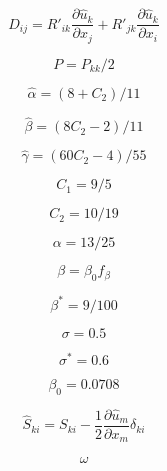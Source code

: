 \begin{equation}
D_{ij} = R'_{ik}
\frac{\partial \hat u_k}{\partial x_j}
+ R'_{jk} \frac{\partial \hat u_k}{\partial x_i}
\end{equation}

\begin{equation}
P = P_{kk}/2
\end{equation}

\begin{equation}
\hat \alpha = (8+C_2)/11
\end{equation}

\begin{equation}
\hat \beta = (8 C_2-2)/11
\end{equation}

\begin{equation}
\hat \gamma = (60 C_2 - 4)/55
\end{equation}

\begin{equation}
C_1 = 9/5
\end{equation}

\begin{equation}
C_2 = 10/19
\end{equation}

\begin{equation}
\alpha = 13/25
\end{equation}

\begin{equation}
\beta = \beta_0 f_{\beta}
\end{equation}

\begin{equation}
\beta^* = 9/100
\end{equation}

\begin{equation}
\sigma=0.5
\end{equation}

\begin{equation}
\sigma^*=0.6
\end{equation}

\begin{equation}
\beta_0 = 0.0708
\end{equation}

\begin{equation}
\hat S_{ki} = S_{ki} - \frac{1}{2} \frac{\partial \hat u_m}{\partial x_m} \delta_{ki}
\end{equation}

\begin{equation}
\omega
\end{equation}

